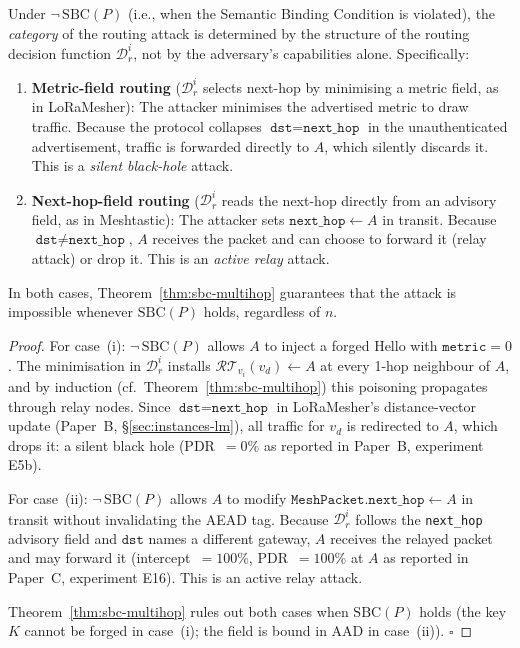 \begin{corollary}
\label{cor:taxonomy}
Under $\neg\,\mathrm{SBC}(P)$ (i.e., when the Semantic Binding Condition
is violated), the \emph{category} of the routing attack is determined by
the structure of the routing decision function $\mathcal{D}_r^i$, not
by the adversary's capabilities alone.
Specifically:
\begin{enumerate}[label=(\roman*)]
  \item \textbf{Metric-field routing} ($\mathcal{D}_r^i$ selects
        next-hop by minimising a metric field, as in LoRaMesher):
        The attacker minimises the advertised metric to draw traffic.
        Because the protocol collapses $\texttt{dst} = \texttt{next\_hop}$
        in the unauthenticated advertisement, traffic is forwarded
        directly to $A$, which silently discards it.
        This is a \emph{silent black-hole} attack.
  \item \textbf{Next-hop-field routing} ($\mathcal{D}_r^i$ reads the
        next-hop directly from an advisory field, as in Meshtastic):
        The attacker sets $\texttt{next\_hop} \leftarrow A$ in transit.
        Because $\texttt{dst} \neq \texttt{next\_hop}$, $A$ receives the
        packet and can choose to forward it (relay attack) or drop it.
        This is an \emph{active relay} attack.
\end{enumerate}
In both cases, Theorem~\ref{thm:sbc-multihop} guarantees that the attack
is impossible whenever $\mathrm{SBC}(P)$ holds, regardless of $n$.
\end{corollary}

\begin{proof}
For case~(i): $\neg\,\mathrm{SBC}(P)$ allows $A$ to inject a forged Hello
with $\texttt{metric} = 0$.
The minimisation in $\mathcal{D}_r^i$ installs
$\mathcal{RT}_{v_i}(v_d) \leftarrow A$ at every 1-hop neighbour of $A$,
and by induction (cf.\ Theorem~\ref{thm:sbc-multihop}) this poisoning
propagates through relay nodes.
Since $\texttt{dst} = \texttt{next\_hop}$ in LoRaMesher's
distance-vector update (Paper~B, §\ref{sec:instances-lm}), all traffic
for $v_d$ is redirected to $A$, which drops it: a silent black hole
(PDR~$= 0\%$ as reported in Paper~B, experiment E5b).

For case~(ii): $\neg\,\mathrm{SBC}(P)$ allows $A$ to modify
$\texttt{MeshPacket.next\_hop} \leftarrow A$ in transit without
invalidating the AEAD tag.
Because $\mathcal{D}_r^i$ follows the \texttt{next\_hop} advisory field
and $\texttt{dst}$ names a different gateway, $A$ receives the relayed
packet and may forward it (intercept~$= 100\%$, PDR~$= 100\%$ at $A$ as
reported in Paper~C, experiment E16).
This is an active relay attack.

Theorem~\ref{thm:sbc-multihop} rules out both cases when
$\mathrm{SBC}(P)$ holds (the key $K$ cannot be forged in case~(i);
the field is bound in AAD in case~(ii)).
\hfill$\square$
\end{proof}

